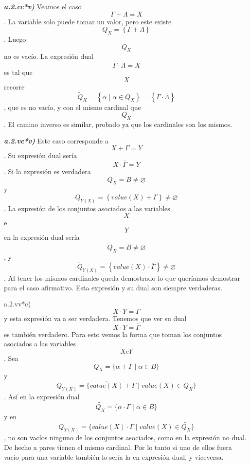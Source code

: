 \begin{enumerate}
\begin{enumerate}
\begin{enumerate}
\begin{enumerate}
\begin{enumerate}
          \emph{\textbf{a.2.cc*v)}} Veamos el caso
          \[{\Gamma + \Lambda} = X\]. La variable solo puede tomar un
          va\-lor, pero este existe
          \[Q_{X} = \left\{ {\Gamma + \Lambda} \right\}\]. Luego
          \[Q_{X}\]no es vacío. La expresión dual
          \[{\overline{\Gamma} \cdot \overline{\Lambda}} = X\]es tal que
          \[X\]recorre
          \[{{\widetilde{Q}}_{X} = \left\{ {\overline{\alpha} \mid {\alpha \in Q_{X}}} \right\}} = \left\{ {\overline{\Gamma} \cdot \overline{\Lambda}} \right\}\],
          que es no vacío, y con el mismo cardinal que \[Q_{X}\]. El
          camino inverso es similar, probado ya que los cardinales son
          los mismos.

          \emph{\textbf{a.2.vc*v)}} Este caso corresponde a
          \[{X + \Gamma} = Y\]. Su expresión dual sería
          \[{X \cdot \overline{\Gamma}} = Y\]. Si la expresión es
          verdadera \[{Q_{X} = B} \neq \varnothing\]y
          \[{Q_{Y{(X)}} = \left\{ {\mathit{value}{{(X)} + \Gamma}} \right\}} \neq \varnothing\].
          La expresión de los conjuntos asociados a las variables \[X\]
          e \[Y\] en la expresión dual sería
          \[{{\widetilde{Q}}_{X} = B} \neq \varnothing\], y
          \[{{\widetilde{Q}}_{Y{(X)}} = \left\{ {{\mathit{value}{(X)}} \cdot \overline{\Gamma}} \right\}} \neq \varnothing\].
          Al tener los mismos cardinales queda demos\-trado lo que
          queríamos demostrar para el caso afirmativo. Esta expresión y
          su dual son siempre verdaderas.

          a.2.vv*c)\[{X \cdot Y} = \Gamma\]y esta expresión va a ser
          verdadera. Tenemos que ver su dual
          \[{X \cdot Y} = \overline{\Gamma}\]es también verdadero. Para
          esto vemos la forma que toman los conjuntos asociados a las
          variables \[X\text{e}Y\]. Sea
          \[Q_{X} = {\{{{\alpha + \Gamma} \mid {\alpha \in B}}\}}\] y
          \[Q_{Y{(X)}} = {\{{{\overline{\mathit{value}{(X)}} + \Gamma} \mid \mathit{value}{{(X)} \in Q_{X}}}\}}\].
          Así en la expresión dual
          \[\widetilde{Q_{X}} = {\{{{\overline{\alpha} \cdot \overline{\Gamma}} \mid {\alpha \in B}}\}}\]
          y en
          \[Q_{Y{(X)}} = {\{{{{\mathit{value}{(X)}} \cdot \overline{\Gamma}} \mid \mathit{value}{{(X)} \in \widetilde{Q_{X}}}}\}}\],
          no son vacíos ninguno de los conjuntos asociados, como en la
          expresión no dual. De hecho a pares tienen el mismo cardinal.
          Por lo tanto si uno de ellos fuera va\-cío para una variable
          también lo sería la en expresión dual, y viceversa.


\end{enumerate}
\end{enumerate}
\end{enumerate}
\end{enumerate}
\end{enumerate}

